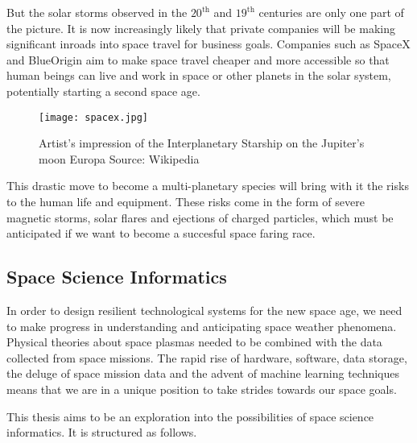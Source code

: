 But the solar storms observed in the $20^{\text{th}}$ and $19^{\text{th}}$ centuries are only one part of the 
picture. It is now increasingly likely that private companies will be making significant inroads into space 
travel for business goals. Companies such as SpaceX and BlueOrigin aim to make space travel cheaper and more 
accessible so that human beings can live and work in space or other planets in the solar system, potentially 
starting a second space age.


\begin{wrapfigure}{l}{0.4\textwidth}
    \centering\texttt{[image: spacex.jpg]}
    \caption{
        \small Artist's impression of the Interplanetary Starship on the Jupiter's moon Europa Source: Wikipedia}
    \label{fig:spacex}
\end{wrapfigure}

This drastic move to become a multi-planetary species will bring with it the risks to the human life and equipment. 
These risks come in the form of severe magnetic storms, solar flares and ejections of charged particles, which must 
be anticipated if we want to become a succesful space faring race. 

\subsection*{Space Science Informatics}

In order to design resilient technological systems for the new space age, we need to make progress in understanding 
and anticipating space weather phenomena. Physical theories about space plasmas needed to be combined with the data 
collected from space missions. The rapid rise of hardware, software, data storage, the deluge of space mission data 
and the advent of machine learning techniques means that we are in a unique position to take strides towards our 
space goals.

This thesis aims to be an exploration into the possibilities of space science informatics. It is structured as follows.

